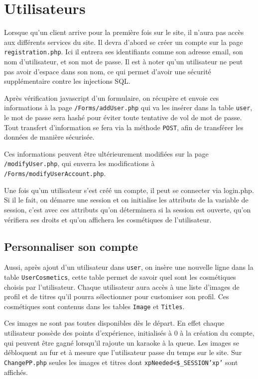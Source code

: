 \section{Utilisateurs}

Lorsque qu'un client arrive pour la première fois sur le site, il n'aura pas accès aux différents services du site. Il devra d'abord se créer un compte sur la page \texttt{registration.php}. Ici il entrera ses 
identifiants comme son adresse email, son nom d'utilisateur, et son mot de passe.
Il est à noter qu'un utilisateur ne peut pas avoir d'espace dans son nom, ce qui permet d'avoir une sécurité supplémentaire contre les injections SQL.

Après vérification javascript d'un formulaire, on récupère et envoie ces informations à la page \texttt{/Forms/addUser.php} qui va les insérer dans la table \texttt{user}, le mot de passe sera hashé pour éviter toute tentative de vol de mot de passe. Tout transfert d'information se fera via la méthode \texttt{POST}, afin de transférer les données de manière sécurisée.

Ces informations peuvent être  ultérieurement modifiées sur la page \texttt{/modifyUser.php}, qui enverra les modifications à \texttt{/Forms/modifyUserAccount.php}.

Une fois qu'un utilisateur s'est créé un compte, il peut se connecter via login.php. Si il le fait, on démarre une session et on initialise les attributs de la variable de session, c'est avec ces attributs qu'on déterminera si la session est ouverte, qu'on vérifiera ses droits et qu'on affichera les cosmétiques de l'utilisateur.

\subsection{Personnaliser son compte}

Aussi, après ajout d'un utilisateur dans \texttt{user}, on insère une nouvelle ligne dans la table \texttt{UserCosmetics}, cette table permet de savoir quel sont les cosmétiques choisis par l'utilisateur.  
Chaque utilisateur aura accès à une liste d'images de profil et de titres qu'il pourra sélectionner pour customiser son profil. Ces cosmétiques sont contenus dans les tables \texttt{Image} et \texttt{Titles}.

Ces images ne sont pas toutes disponibles dès le départ. En effet chaque utilisateur possède des points d'expérience, initialisés à 0 à la création du compte, qui peuvent être gagné lorsqu'il rajoute un karaoke à la queue. Les images se débloquent au fur et à mesure que l'utilisateur passe du temps sur le site. Sur \texttt{ChangePP.php} seules les images et titres dont \texttt{xpNeeded<\$\_SESSION\lbrack'xp'\rbrack} sont affichés.

